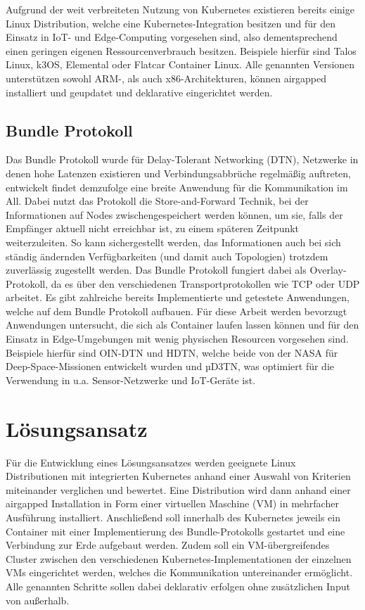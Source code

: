 \documentclass[
  ngerman,
  symmetric,
  cdfont=on,
  numbers=noenddot,
  parskip
]{tudscrreprt}
\begin{document}
Aufgrund der weit verbreiteten Nutzung von Kubernetes existieren bereits einige Linux Distribution, welche  eine Kubernetes-Integration besitzen und für den Einsatz in IoT- und Edge-Computing vorgesehen sind, also dementsprechend einen geringen eigenen Ressourcenverbrauch besitzen. Beispiele hierfür sind Talos Linux, k3OS, Elemental oder Flatcar Container Linux. Alle genannten Versionen unterstützen sowohl ARM-, als auch x86-Architekturen, können airgapped installiert und geupdatet und deklarative eingerichtet werden.

\subsection{Bundle Protokoll}
Das Bundle Protokoll wurde für Delay-Tolerant Networking (DTN), Netzwerke in denen hohe Latenzen existieren und Verbindungsabbrüche regelmäßig auftreten, entwickelt findet demzufolge eine breite Anwendung für die Kommunikation im All.\cite{bundleProtocoll_rfc} Dabei nutzt das Protokoll die Store-and-Forward Technik, bei der Informationen auf Nodes zwischengespeichert werden können, um sie, falls der Empfänger aktuell nicht erreichbar ist, zu einem späteren Zeitpunkt weiterzuleiten. So kann sichergestellt werden, das Informationen auch bei sich ständig ändernden Verfügbarkeiten (und damit auch Topologien) trotzdem zuverlässig zugestellt werden. Das Bundle Protokoll fungiert dabei als Overlay-Protokoll, da es über den verschiedenen Transportprotokollen wie TCP oder UDP arbeitet. Es gibt zahlreiche bereits Implementierte und getestete Anwendungen, welche auf dem Bundle Protokoll aufbauen. Für diese Arbeit werden bevorzugt Anwendungen untersucht, die sich als Container laufen lassen können und für den Einsatz in Edge-Umgebungen mit wenig physischen Resourcen vorgesehen sind. Beispiele hierfür sind OIN-DTN\cite{ION} und HDTN\cite{hdtn}, welche beide von der NASA für Deep-Space-Missionen entwickelt wurden und µD3TN\cite{µD3TN}, was optimiert für die Verwendung in u.a. Sensor-Netzwerke und IoT-Geräte ist. 

\section{Lösungsansatz}
Für die Entwicklung eines Lösungsansatzes werden geeignete Linux Distributionen mit integrierten Kubernetes anhand einer Auswahl von Kriterien miteinander verglichen und bewertet. Eine Distribution wird dann anhand einer airgapped Installation in Form einer virtuellen Maschine (VM) in mehrfacher Ausführung installiert. Anschließend soll innerhalb des Kubernetes jeweils ein Container mit einer Implementierung des Bundle-Protokolls gestartet und eine Verbindung zur Erde aufgebaut werden. Zudem soll ein VM-übergreifendes Cluster zwischen den verschiedenen Kubernetes-Implementationen der einzelnen VMs eingerichtet werden, welches die Kommunikation untereinander ermöglicht. Alle genannten Schritte sollen dabei deklarativ erfolgen ohne zusätzlichen Input von außerhalb. 
\end{document}
